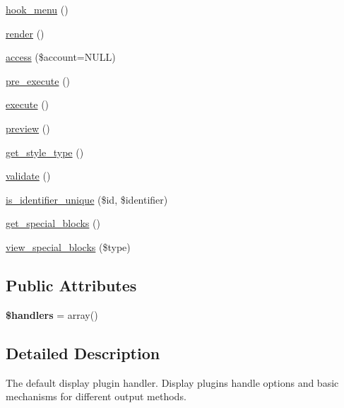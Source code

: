 \begin{CompactItemize}
\item 
\hyperlink{classviews__plugin__display_f81f784641ab255c20044ef3e70efd1d}{hook\_\-menu} ()
\item 
\hyperlink{classviews__plugin__display_cf230a4b44b452c9469f5df92e58e32e}{render} ()
\item 
\hyperlink{classviews__plugin__display_122d9a961584bfb6f0c4c78715c543e5}{access} (\$account=NULL)
\item 
\hyperlink{classviews__plugin__display_04a01e109a38effdfbf77f78ecfd67ad}{pre\_\-execute} ()
\item 
\hyperlink{classviews__plugin__display_f99c4a303d3e409ab7b14c6cfcd3a1d8}{execute} ()
\item 
\hyperlink{classviews__plugin__display_39a392ae163b9d5850559e3cf098e64f}{preview} ()
\item 
\hyperlink{classviews__plugin__display_03f77cb37c3c3219d031c153aa59d20e}{get\_\-style\_\-type} ()
\item 
\hyperlink{classviews__plugin__display_3282edb1b32b756937fe2d0c8757c80c}{validate} ()
\item 
\hyperlink{classviews__plugin__display_089aaa0e268fbbc4aae2db742a7f036d}{is\_\-identifier\_\-unique} (\$id, \$identifier)
\item 
\hyperlink{classviews__plugin__display_1bdcb99f6d9a78a4b035c254af48cb99}{get\_\-special\_\-blocks} ()
\item 
\hyperlink{classviews__plugin__display_580af377b7d46013594e518c1d31534b}{view\_\-special\_\-blocks} (\$type)
\end{CompactItemize}
\subsection*{Public Attributes}
\begin{CompactItemize}
\item 
\hypertarget{classviews__plugin__display_0922a139cadeb3529534b8772329e98d}{
\textbf{\$handlers} = array()}
\label{classviews__plugin__display_0922a139cadeb3529534b8772329e98d}

\end{CompactItemize}


\subsection{Detailed Description}
The default display plugin handler. Display plugins handle options and basic mechanisms for different output methods. 

